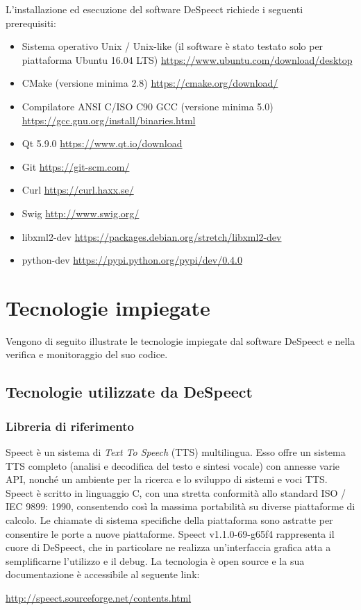 \documentclass[openany,12pt,a4paper]{report}
\begin{document}
	L'installazione ed esecuzione del software DeSpeect richiede i seguenti prerequisiti:
	
	\begin{itemize}
		\item Sistema operativo Unix / Unix-like (il software è stato testato solo per piattaforma Ubuntu 16.04 LTS)
			\subitem \url{https://www.ubuntu.com/download/desktop}
		\item CMake (versione minima 2.8)
			\subitem \url{https://cmake.org/download/}
		\item Compilatore ANSI C/ISO C90 \gls{GCC} (versione minima 5.0)
			\subitem \url{https://gcc.gnu.org/install/binaries.html}
		\item \Gls{Qt} 5.9.0
			\subitem \url{https://www.qt.io/download}
		\item Git
			\subitem \url{https://git-scm.com/} 
		\item Curl 
			\subitem \url{https://curl.haxx.se/}
		\item Swig 
			\subitem \url{http://www.swig.org/}
		\item libxml2-dev
			\subitem \url{https://packages.debian.org/stretch/libxml2-dev} 
		\item python-dev
			\subitem \url{https://pypi.python.org/pypi/dev/0.4.0}
	\end{itemize}

	\chapter{Tecnologie impiegate}
	
	Vengono di seguito illustrate le tecnologie impiegate dal software DeSpeect e nella verifica e monitoraggio del suo codice.
	
	\section{Tecnologie utilizzate da DeSpeect}
	
	\subsection{Libreria di riferimento}
	Speect è un sistema di \textit{Text To Speech} (TTS) multilingua. Esso offre un sistema TTS completo (analisi e decodifica del testo e sintesi vocale) con annesse varie API, nonché un ambiente per la ricerca e lo sviluppo di sistemi e voci TTS. Speect è scritto in linguaggio C, con una stretta conformità allo standard ISO / IEC 9899: 1990, consentendo così la massima portabilità su diverse piattaforme di calcolo. Le chiamate di sistema specifiche della piattaforma sono astratte per consentire le porte a nuove piattaforme. Speect v1.1.0-69-g65f4 rappresenta il cuore di DeSpeect, che in particolare ne realizza un'interfaccia grafica atta a semplificarne l'utilizzo e il debug. La tecnologia è open source e la sua documentazione è accessibile al seguente link:
	\begin{center}
	\url{http://speect.sourceforge.net/contents.html}
	\end{center}
	
\end{document}
